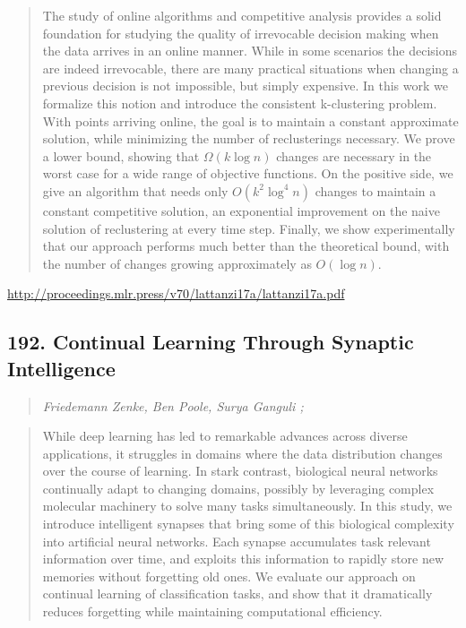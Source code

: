 \documentclass{article}
\begin{document}
\begin{quote}
    The study of online algorithms and competitive analysis provides a solid foundation for studying the quality of irrevocable decision making when the data arrives in an online manner. While in some scenarios the decisions are indeed irrevocable, there are many practical situations when changing a previous decision is not impossible, but simply expensive. In this work we formalize this notion and introduce the consistent k-clustering problem. With points arriving online, the goal is to maintain a constant approximate solution, while minimizing the number of reclusterings necessary. We prove a lower bound, showing that $\Omega(k \log n)$ changes are necessary in the worst case for a wide range of objective functions. On the positive side, we give an algorithm that needs only $O(k^2 \log^4n)$ changes to maintain a constant competitive solution, an exponential improvement on the naive solution of reclustering at every time step. Finally, we show experimentally that our approach performs much better than the theoretical bound, with the number of changes growing approximately as $O(\log n)$.  
\end{quote}

\href{http://proceedings.mlr.press/v70/lattanzi17a/lattanzi17a.pdf}{http://proceedings.mlr.press/v70/lattanzi17a/lattanzi17a.pdf}

\subsection{192. Continual Learning Through Synaptic Intelligence}

\begin{quote}
\footnotesize{\textit{Friedemann Zenke, Ben Poole, Surya Ganguli ;}}

\end{quote}

\begin{quote}
    While deep learning has led to remarkable advances across diverse applications, it struggles in domains where the data distribution changes over the course of learning. In stark contrast, biological neural networks continually adapt to changing domains, possibly by leveraging complex molecular machinery to solve many tasks simultaneously. In this study, we introduce intelligent synapses that bring some of this biological complexity into artificial neural networks. Each synapse accumulates task relevant information over time, and exploits this information to rapidly store new memories without forgetting old ones. We evaluate our approach on continual learning of classification tasks, and show that it dramatically reduces forgetting while maintaining computational efficiency.  
\end{quote}
\end{document}
